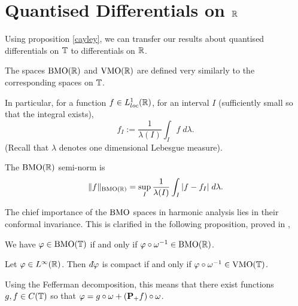 \section{Quantised Differentials on $\mathbb{R}$}
Using proposition \ref{cayley}, we can transfer our results
about quantised differentials on $\mathbb{T}$ to differentials on $\mathbb{R}$.

\begin{definition}
    The spaces $\operatorname{BMO}(\mathbb{R})$ and $\operatorname{VMO}(\mathbb{R})$ are defined
    very similarly to the corresponding spaces on $\mathbb{T}$. 
    
    In particular, for a function $f \in L^1_{loc}(\mathbb{R})$, for
    an interval $I$ (sufficiently small so that the integral exists),
    \begin{equation}
        f_I := \frac{1}{\lambda(I)}\int_I f\;d\lambda.
    \end{equation}
    (Recall that $\lambda$ denotes one dimensional Lebesgue measure).
    
    The $\operatorname{BMO}(\mathbb{R})$ semi-norm is
    \begin{equation}
        \|f\|_{\operatorname{BMO}(\mathbb{R})} = \sup_{I} \frac{1}{\lambda(I)}\int_I |f-f_I|\;d\lambda.
    \end{equation}
\end{definition}

The chief importance of the $\operatorname{BMO}$ spaces in harmonic analysis
lies in their conformal invariance. This is clarified in the following proposition,
proved in \cite[Cor 1.3, p.129]{Garnett},
\begin{proposition}
    We have $\varphi \in \operatorname{BMO}(\mathbb{T})$ if and only if $\varphi \circ \omega^{-1} \in \operatorname{BMO}(\mathbb{R})$.
\end{proposition}

\begin{proposition}
    Let $\varphi \in L^\infty(\mathbb{R})$. Then $\qd \varphi$ is compact
    if and only if $\varphi \circ \omega^{-1} \in \operatorname{VMO}(\mathbb{T})$.
    
    Using the Fefferman decomposition, this means that 
    there exist functions $g,f \in C(\mathbb{T})$ so that
    $\varphi = g\circ\omega + (\mathbf{P}_+f)\circ \omega$. 
\end{proposition}


